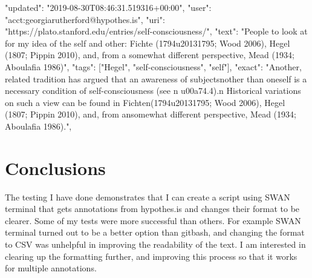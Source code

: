 \documentclass{article}
\begin{document}
\newline
"updated": "2019-08-30T08:46:31.519316+00:00", 
\newline
"user": "acct:georgiarutherford@hypothes.is", 
\newline
"uri": "https://plato.stanford.edu/entries/self-consciousness/", 
\newline
"text": "People to look at for my idea of the self and other: Fichte (1794u20131795; Wood 2006), Hegel (1807; Pippin 2010), and, from a somewhat different perspective, Mead (1934; Aboulafia 1986)", 
\newline
"tags": ["Hegel", "self-consciousness", "self"], 
\newline
"exact": "Another, related tradition has argued that an awareness of subjectsnother than oneself is a necessary condition of self-consciousness (see n u00a74.4).n Historical variations on such a view can be found in Fichten(1794u20131795; Wood 2006), Hegel (1807; Pippin 2010), and, from ansomewhat different perspective, Mead (1934; Aboulafia 1986).", 

\section{Conclusions}
The testing I have done demonstrates that I can create a script using SWAN terminal that gets annotations from hypothes.is and changes their format to be clearer. Some of my tests were more successful than others. For example SWAN terminal turned out to be a better option than gitbash, and changing the format to CSV was unhelpful in improving the readability of the text.  I am interested in clearing up the formatting further, and improving this process so that it works for multiple annotations. 
\end{document}
